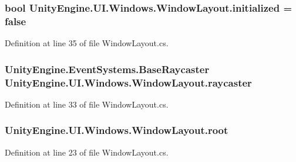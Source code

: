 \subsubsection[{initialized}]{\setlength{\rightskip}{0pt plus 5cm}bool Unity\+Engine.\+U\+I.\+Windows.\+Window\+Layout.\+initialized = false}\label{class_unity_engine_1_1_u_i_1_1_windows_1_1_window_layout_a170e4ae580d5ea419e20dc0b6296179e}


Definition at line 35 of file Window\+Layout.\+cs.

\hypertarget{class_unity_engine_1_1_u_i_1_1_windows_1_1_window_layout_a054ac03b92e5d5181128ff1a258a98c5}{}
\subsubsection[{raycaster}]{\setlength{\rightskip}{0pt plus 5cm}Unity\+Engine.\+Event\+Systems.\+Base\+Raycaster Unity\+Engine.\+U\+I.\+Windows.\+Window\+Layout.\+raycaster}\label{class_unity_engine_1_1_u_i_1_1_windows_1_1_window_layout_a054ac03b92e5d5181128ff1a258a98c5}


Definition at line 33 of file Window\+Layout.\+cs.

\hypertarget{class_unity_engine_1_1_u_i_1_1_windows_1_1_window_layout_ac597e7eab6633cd6de35130204453d48}{}
\subsubsection[{root}]{ Unity\+Engine.\+U\+I.\+Windows.\+Window\+Layout.\+root}\label{class_unity_engine_1_1_u_i_1_1_windows_1_1_window_layout_ac597e7eab6633cd6de35130204453d48}


Definition at line 23 of file Window\+Layout.\+cs.

\hypertarget{class_unity_engine_1_1_u_i_1_1_windows_1_1_window_layout_a33e8f916ed337b6106080059b2ff3329}{}
